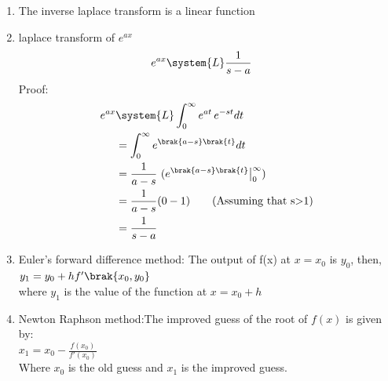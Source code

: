 \begin{enumerate}[label=\thesubsection.\arabic*,ref=\thesubsection.\theenumi]
\item 
The inverse laplace transform is a linear function\label{eq:linearinverselaplace}
\item
laplace transform of $e^{ax}$
\begin{align}
	e^{ax}&\system{L}\frac{1}{s-a}\label{eq:laplacee^ax}
\end{align}
Proof:
\begin{align}	
    e^{ax}&\system{L}\int_{0}^{\infty}e^{at}\,e^{-st} dt\\
                      &=\int_{0}^{\infty}e^{\brak{a-s}\brak{t}} dt\\
                      &=\frac{1}{a-s}\,\,(e^{\brak{a-s}\brak{t}}\big|_{0}^{\infty})\\
                      &=\frac{1}{a-s}(0-1)\tag{Assuming that s$>$1}\\
                      &=\frac{1}{s-a}
\end{align}
\item
Euler's forward difference method: The output of f(x) at $x=x_0$ is $y_0$, then,\\
$y_1=y_0+hf'\brak{x_0,y_0}\label{eq:fwdeuler}$\\
where $y_1$ is the value of the function at $x=x_0+h$\\
\item 
Newton Raphson method:The improved guess of the root of $f(x)$ is given by:\\
$x_1=x_0-\frac{f(x_0)}{f'(x_0)}\label{eq:raph}$\\ 
Where $x_0$ is the old guess and $x_1$ is the improved guess.







\end{enumerate}


